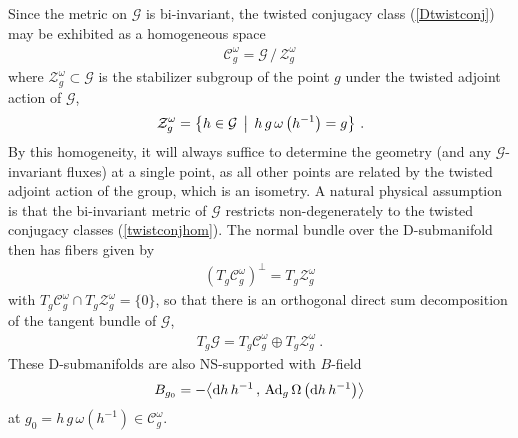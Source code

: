 \documentclass[11pt,a4paper]{article}
\def\dd{{\rm d}}
\newcommand{\beq}{\begin{eqnarray}}
\newcommand{\eeq}{\end{eqnarray}}
\begin{document}
Since the metric on $\mathcal{G}$ is bi-invariant, the twisted conjugacy class
(\ref{Dtwistconj}) may be exhibited as a homogeneous space
\beq
{\mathcal C}_g^\omega=\mathcal{G}\,/\,{\mathcal Z}_g^\omega
\label{twistconjhom}\eeq
where ${\mathcal Z}_g^\omega\subset \mathcal{G}$ is the stabilizer subgroup of the point
$g$ under the twisted adjoint action of $\mathcal{G}$,
\beq
{\mathcal Z}_g^\omega=\bigl\{h\in \mathcal{G}\,\bigm|\,h\,g\,\omega\left(h^{-1}
\right)=g\bigr\} \ .
\label{stabdef}\eeq
By this homogeneity, it will always suffice to determine the geometry
(and any $\mathcal{G}$-invariant fluxes) at a single point, as all other points
are related by the twisted adjoint action of the group, which is an
isometry. A natural physical assumption is that the bi-invariant
metric of $\mathcal{G}$ restricts non-degenerately to the twisted conjugacy
classes (\ref{twistconjhom}). The normal bundle over the D-submanifold
then has fibers given by
\beq
\left(T_g\mathcal{C}_g^\omega\right)^\perp=T_g\mathcal{Z}_g^\omega
\label{twistconjnorm}\eeq
with $T_g\mathcal{C}_g^\omega\cap T_g\mathcal{Z}_g^\omega=\{0\}$, so
that there is an orthogonal direct sum decomposition of the tangent
bundle of $\mathcal{G}$,
\beq
T_g\mathcal{G}=T_g\mathcal{C}_g^\omega\oplus T_g\mathcal{Z}_g^\omega \ .
\label{TgGdecomp}\eeq
These D-submanifolds are also NS-supported with $B$-field
\beq
B_{g_0}=-\bigl\langle\dd h\,h^{-1}\,,\,{\rm Ad}_g\,\Omega\left(
\dd h\,h^{-1}\right)\bigr\rangle
\label{Bfieldg0}\eeq
at $g_0=h\,g\,\omega(h^{-1})\in{\mathcal C}_g^\omega$.
\end{document}
